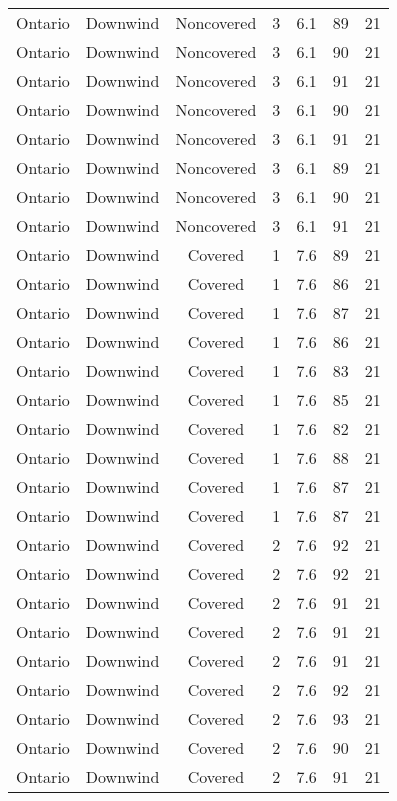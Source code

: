 \documentclass{article}
\begin{document}
\begin{longtable}[H]{ccccccc}
Ontario & Downwind & Noncovered & 3 & 6.1  & 89  & 21 \\
Ontario & Downwind & Noncovered & 3 & 6.1  & 90  & 21 \\
Ontario & Downwind & Noncovered & 3 & 6.1  & 91  & 21 \\
Ontario & Downwind & Noncovered & 3 & 6.1  & 90  & 21 \\
Ontario & Downwind & Noncovered & 3 & 6.1  & 91  & 21 \\
Ontario & Downwind & Noncovered & 3 & 6.1  & 89  & 21 \\
Ontario & Downwind & Noncovered & 3 & 6.1  & 90  & 21 \\
Ontario & Downwind & Noncovered & 3 & 6.1  & 91  & 21 \\
Ontario & Downwind & Covered     & 1 & 7.6  & 89  & 21 \\
Ontario & Downwind & Covered     & 1 & 7.6  & 86  & 21 \\
Ontario & Downwind & Covered     & 1 & 7.6  & 87  & 21 \\
Ontario & Downwind & Covered     & 1 & 7.6  & 86  & 21 \\
Ontario & Downwind & Covered     & 1 & 7.6  & 83  & 21 \\
Ontario & Downwind & Covered     & 1 & 7.6  & 85  & 21 \\
Ontario & Downwind & Covered     & 1 & 7.6  & 82  & 21 \\
Ontario & Downwind & Covered     & 1 & 7.6  & 88  & 21 \\
Ontario & Downwind & Covered     & 1 & 7.6  & 87  & 21 \\
Ontario & Downwind & Covered     & 1 & 7.6  & 87  & 21 \\
Ontario & Downwind & Covered     & 2 & 7.6  & 92  & 21 \\
Ontario & Downwind & Covered     & 2 & 7.6  & 92  & 21 \\
Ontario & Downwind & Covered     & 2 & 7.6  & 91  & 21 \\
Ontario & Downwind & Covered     & 2 & 7.6  & 91  & 21 \\
Ontario & Downwind & Covered     & 2 & 7.6  & 91  & 21 \\
Ontario & Downwind & Covered     & 2 & 7.6  & 92  & 21 \\
Ontario & Downwind & Covered     & 2 & 7.6  & 93  & 21 \\
Ontario & Downwind & Covered     & 2 & 7.6  & 90  & 21 \\
Ontario & Downwind & Covered     & 2 & 7.6  & 91  & 21 \\

\end{longtable}
\end{document}
